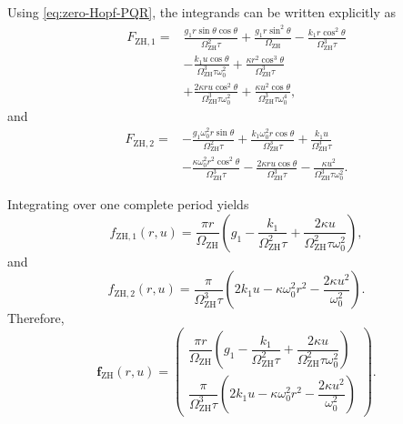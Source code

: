 \documentclass[11pt,reqno]{amsart}
\theoremstyle{plain}
\theoremstyle{definition}
\theoremstyle{remark}
\begin{document}
Using \eqref{eq:zero-Hopf-PQR}, the integrands can be written explicitly
as
\begin{equation}
\label{eq:zero-Hopf-F1-expanded}
\begin{aligned}
F_{\mathrm{ZH},1}
={}&
\frac{
g_1r\sin\theta\cos\theta
}{
\Omega_{\mathrm{ZH}}^2\tau
}
+
\frac{
g_1r\sin^2\theta
}{
\Omega_{\mathrm{ZH}}
}
-
\frac{
k_1r\cos^2\theta
}{
\Omega_{\mathrm{ZH}}^3\tau
}
\\
&-
\frac{
k_1u\cos\theta
}{
\Omega_{\mathrm{ZH}}^3\tau\omega_0^2
}
+
\frac{
\kappa r^2\cos^3\theta
}{
\Omega_{\mathrm{ZH}}^3\tau
}
\\
&+
\frac{
2\kappa ru\cos^2\theta
}{
\Omega_{\mathrm{ZH}}^3\tau\omega_0^2
}
+
\frac{
\kappa u^2\cos\theta
}{
\Omega_{\mathrm{ZH}}^3\tau\omega_0^4
},
\end{aligned}
\end{equation}
and
\begin{equation}
\label{eq:zero-Hopf-F2-expanded}
\begin{aligned}
F_{\mathrm{ZH},2}
={}&
-\frac{
g_1\omega_0^2r\sin\theta
}{
\Omega_{\mathrm{ZH}}^2\tau
}
+
\frac{
k_1\omega_0^2r\cos\theta
}{
\Omega_{\mathrm{ZH}}^3\tau
}
+
\frac{k_1u}
{\Omega_{\mathrm{ZH}}^3\tau}
\\
&-
\frac{
\kappa\omega_0^2r^2\cos^2\theta
}{
\Omega_{\mathrm{ZH}}^3\tau
}
-
\frac{
2\kappa ru\cos\theta
}{
\Omega_{\mathrm{ZH}}^3\tau
}
-
\frac{
\kappa u^2
}{
\Omega_{\mathrm{ZH}}^3\tau\omega_0^2
}.
\end{aligned}
\end{equation}

Integrating over one complete period yields
\begin{equation}
\label{eq:zero-Hopf-averaged-first-component}
f_{\mathrm{ZH},1}(r,u)
=
\frac{\pi r}{\Omega_{\mathrm{ZH}}}
\left(
g_1
-
\frac{
k_1
}{
\Omega_{\mathrm{ZH}}^2\tau
}
+
\frac{
2\kappa u
}{
\Omega_{\mathrm{ZH}}^2\tau\omega_0^2
}
\right),
\end{equation}
and
\begin{equation}
\label{eq:zero-Hopf-averaged-second-component}
f_{\mathrm{ZH},2}(r,u)
=
\frac{\pi}
{\Omega_{\mathrm{ZH}}^3\tau}
\left(
2k_1u
-
\kappa\omega_0^2r^2
-
\frac{2\kappa u^2}{\omega_0^2}
\right).
\end{equation}
Therefore,
\begin{equation}
\label{eq:zero-Hopf-first-averaged-function}
\mathbf f_{\mathrm{ZH}}(r,u)
=
\begin{pmatrix}
\dfrac{\pi r}{\Omega_{\mathrm{ZH}}}
\left(
g_1
-
\dfrac{k_1}{\Omega_{\mathrm{ZH}}^2\tau}
+
\dfrac{
2\kappa u
}{
\Omega_{\mathrm{ZH}}^2\tau\omega_0^2
}
\right)
\\[6mm]
\dfrac{\pi}{\Omega_{\mathrm{ZH}}^3\tau}
\left(
2k_1u
-
\kappa\omega_0^2r^2
-
\dfrac{2\kappa u^2}{\omega_0^2}
\right)
\end{pmatrix}.
\end{equation}
\end{document}
